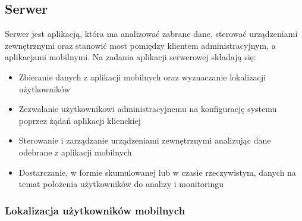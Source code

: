 \documentclass{article}
\begin{document}
	\subsection{Serwer}
		Serwer jest aplikacją, która ma analizować zabrane dane, sterować urządzeniami zewnętrznymi oraz stanowić most pomiędzy klientem administracyjnym, a aplikacjami mobilnymi. Na zadania aplikacji serwerowej składają się:
		\begin{itemize}
			\item Zbieranie danych z aplikacji mobilnych oraz wyznaczanie lokalizacji użytkowników
			\item Zezwalanie użytkownikowi administracyjnemu na konfigurację systemu poprzez żądań aplikacji klienckiej
			\item Sterowanie i zarządzanie urządzeniami zewnętrznymi analizując dane odebrane z aplikacji mobilnych
			\item Dostarczanie, w formie skumulowanej lub w czasie rzeczywistym, danych na temat położenia użytkowników do analizy i monitoringu
		\end{itemize}
		\subsubsection{Lokalizacja użytkowników mobilnych}
\end{document}
